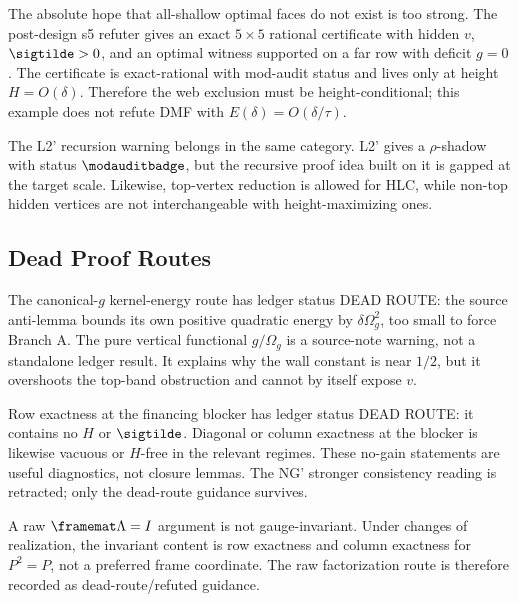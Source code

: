 \begin{downgradedstatement}
\downgradedbadge The absolute hope that all-shallow optimal faces do not exist is too
strong.  The post-design s5 refuter gives an exact \(5\times5\) rational certificate
with hidden \(v\), \(\sigtilde>0\), and an optimal witness supported on a far row with
deficit \(g=0\).  The certificate is exact-rational with mod-audit status and lives only
at height \(H=O(\delta)\).  Therefore the web exclusion must be height-conditional; this
example does not refute DMF with \(E(\delta)=O(\delta/\tau)\).
\end{downgradedstatement}

The L2' recursion warning belongs in the same category.  L2' gives a
\(\rho\)-shadow with status \(\modauditbadge\), but the recursive proof idea built on it
is gapped at the target scale.  Likewise, top-vertex reduction is allowed for HLC, while
non-top hidden vertices are not interchangeable with height-maximizing ones.

\subsection{Dead Proof Routes}

The canonical-\(g\) kernel-energy route has ledger status DEAD ROUTE: the source
anti-lemma bounds its own positive quadratic energy by \(\delta\Omega_g^2\), too small
to force Branch A.  The pure vertical functional \(g/\Omega_g\) is a source-note warning,
not a standalone ledger result.  It explains why the wall constant is near \(1/2\), but
it overshoots the top-band obstruction and cannot by itself expose \(v\).

Row exactness at the financing blocker has ledger status DEAD ROUTE: it contains no
\(H\) or \(\sigtilde\).  Diagonal or column exactness at the blocker is likewise vacuous
or \(H\)-free in the relevant regimes.  These no-gain statements are useful diagnostics,
not closure lemmas.  The NG' stronger consistency reading is retracted; only the
dead-route guidance survives.

\begin{refutedstatement}
 A raw \(\framemat\Lambda=I\) argument is not gauge-invariant.  Under
changes of realization, the invariant content is row exactness and column exactness for
\(P^2=P\), not a preferred frame coordinate.  The raw factorization route is therefore
recorded as dead-route/refuted guidance.
\end{refutedstatement}

